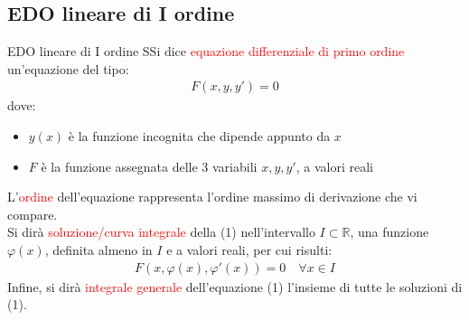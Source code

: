 \documentclass{article}  %
\begin{document}
\subsection{EDO lineare di I ordine}
\begin{definition}{EDO lineare di I ordine}
	SSi dice \textcolor{red}{equazione differenziale di primo ordine} un'equazione del tipo:
	\begin{align}
		F\left(x,y,y'\right) = 0
	\end{align}
	dove:
	\begin{itemize}
		\item $y(x)$ è la funzione incognita che dipende appunto da $x$
		\item $F$ è la funzione assegnata delle $3$ variabili $x,y,y'$, a valori reali
	\end{itemize}
	L'\textcolor{red}{ordine} dell'equazione rappresenta l'ordine massimo di derivazione che vi compare. \\
	Si dirà \textcolor{red}{soluzione/curva integrale} della (1) nell'intervallo $I \subset \mathbb{R}$, una funzione $\varphi(x)$, definita almeno in $I$ e a valori reali, per cui risulti:
	\begin{align*}
		F \left(x, \varphi(x), \varphi'(x)\right) = 0 \quad \forall{x} \in I
	\end{align*}
	Infine, si dirà \textcolor{red}{integrale generale} dell'equazione (1) l'insieme di tutte le soluzioni di (1).
\end{definition}
\end{document}
